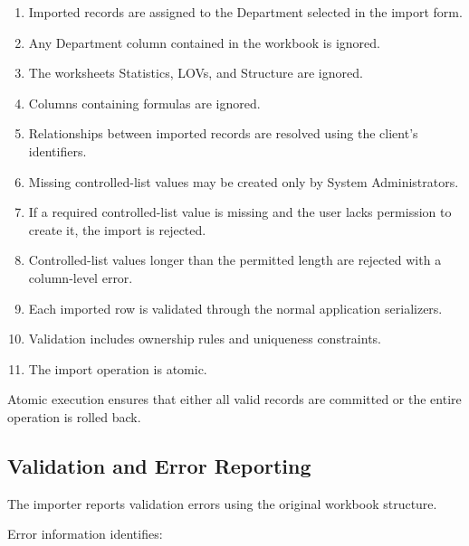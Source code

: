 \documentclass[11pt,a4paper]{article}
\begin{document}
\begin{enumerate}

    \item Imported records are assigned to
    the Department selected in the import form.

    \item Any Department column contained in
    the workbook is ignored.

    \item The worksheets Statistics, LOVs,
    and Structure are ignored.

    \item Columns containing formulas are ignored.

    \item Relationships between imported records
    are resolved using the client's identifiers.

    \item Missing controlled-list values may be
    created only by System Administrators.

    \item If a required controlled-list value
    is missing and the user lacks permission
    to create it, the import is rejected.

    \item Controlled-list values longer than the
    permitted length are rejected with a
    column-level error.

    \item Each imported row is validated through
    the normal application serializers.

    \item Validation includes ownership rules
    and uniqueness constraints.

    \item The import operation is atomic.

\end{enumerate}

Atomic execution ensures that either all
valid records are committed or the entire
operation is rolled back.

\subsection{Validation and Error Reporting}

The importer reports validation errors
using the original workbook structure.

Error information identifies:
\end{document}
